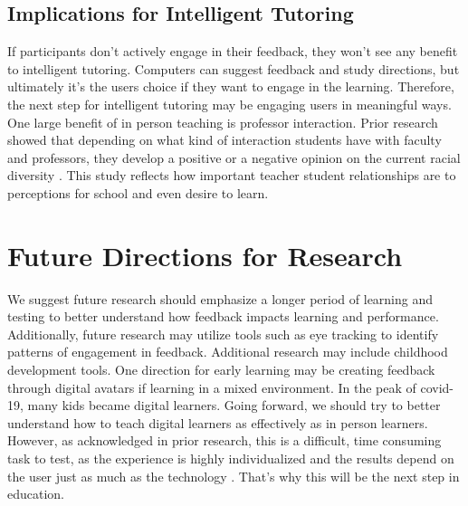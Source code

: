 \documentclass[acmtog]{acmart}
\begin{document}
\subsection{Implications for Intelligent Tutoring}
If participants don't actively engage in their feedback, they won't see any benefit to intelligent tutoring. Computers can suggest feedback and study directions, but ultimately it's the users choice if they want to engage in the learning. Therefore, the next step for intelligent tutoring may be engaging users in meaningful ways. One large benefit of in person teaching is professor interaction. Prior research showed that depending on what kind of interaction students have with faculty and professors, they develop a positive or a negative opinion on the current racial diversity \cite{parker2020student}. This study reflects how important teacher student relationships are to perceptions for school and even desire to learn.

\section{Future Directions for Research}
We suggest future research should emphasize a longer period of learning and testing to better understand how feedback impacts learning and performance. Additionally, future research may utilize tools such as eye tracking to identify patterns of engagement in feedback. Additional research may include childhood development tools. One direction for early learning may be creating feedback through digital avatars if learning in a mixed environment. In the peak of covid-19, many kids became digital learners. Going forward, we should try to better understand how to teach digital learners as effectively as in person learners. However, as acknowledged in prior research, this is a difficult, time consuming task to test, as the experience is highly individualized and the results depend on the user just as much as the technology \cite{tacoma2021combined}. That's why this will be the next step in education.



\end{document}
